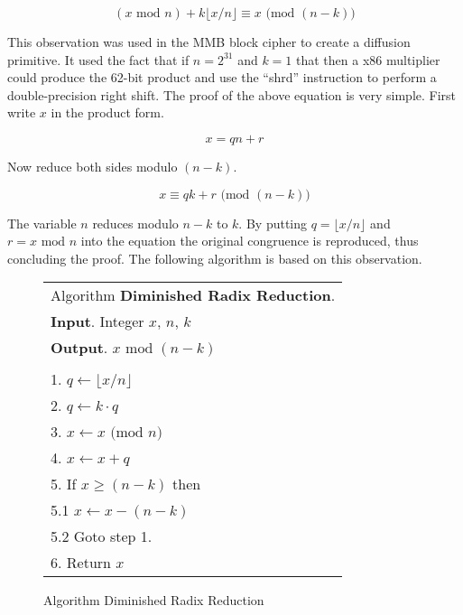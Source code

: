 \documentclass[b5paper]{book}
\begin{document}
\begin{equation}
(x \mbox{ mod } n) + k \lfloor x / n \rfloor \equiv x \mbox{ (mod }(n - k)\mbox{)}
\end{equation}

This observation was used in the MMB \cite{MMB} block cipher to create a diffusion primitive.  It used the fact that if $n = 2^{31}$ and $k=1$ that 
then a x86 multiplier could produce the 62-bit product and use  the ``shrd'' instruction to perform a double-precision right shift.  The proof
of the above equation is very simple.  First write $x$ in the product form.

\begin{equation}
x = qn + r
\end{equation}

Now reduce both sides modulo $(n - k)$.

\begin{equation}
x \equiv qk + r  \mbox{ (mod }(n-k)\mbox{)}
\end{equation}

The variable $n$ reduces modulo $n - k$ to $k$.  By putting $q = \lfloor x/n \rfloor$ and $r = x \mbox{ mod } n$ 
into the equation the original congruence is reproduced, thus concluding the proof.  The following algorithm is based on this observation.

\begin{figure}[!here]
\begin{small}
\begin{center}
\begin{tabular}{l}
\hline Algorithm \textbf{Diminished Radix Reduction}. \\
\textbf{Input}.   Integer $x$, $n$, $k$ \\
\textbf{Output}.  $x \mbox{ mod } (n - k)$ \\
\hline \\
1.  $q \leftarrow \lfloor x / n \rfloor$ \\
2.  $q \leftarrow k \cdot q$ \\
3.  $x \leftarrow x \mbox{ (mod }n\mbox{)}$ \\
4.  $x \leftarrow x + q$ \\
5.  If $x \ge (n - k)$ then \\
\hspace{3mm}5.1  $x \leftarrow x - (n - k)$ \\
\hspace{3mm}5.2  Goto step 1. \\
6.  Return $x$ \\
\hline
\end{tabular}
\end{center}
\end{small}
\caption{Algorithm Diminished Radix Reduction}
\label{fig:DR}
\end{figure}
\end{document}
